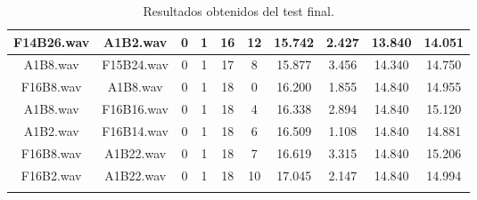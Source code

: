 \documentclass[11pt,a4paper]{book}
\begin{document}
\begin{longtable}[c]{|c|c|c|c|c|c|c|c|c|c|}
F14B26.wav&A1B2.wav&0&1&16&12&15.742&2.427&13.840&14.051\\ \hline
A1B8.wav&F15B24.wav&0&1&17&8&15.877&3.456&14.340&14.750\\ \hline
F16B8.wav&A1B8.wav&0&1&18&0&16.200&1.855&14.840&14.955\\ \hline
A1B8.wav&F16B16.wav&0&1&18&4&16.338&2.894&14.840&15.120\\ \hline
A1B2.wav&F16B14.wav&0&1&18&6&16.509&1.108&14.840&14.881\\ \hline
F16B8.wav&A1B22.wav&0&1&18&7&16.619&3.315&14.840&15.206\\ \hline
F16B2.wav&A1B22.wav&0&1&18&10&17.045&2.147&14.840&14.994\\ \hline
\caption{Resultados obtenidos del test final.}
\end{longtable}
\normalsize

    
    
    
\end{document}
